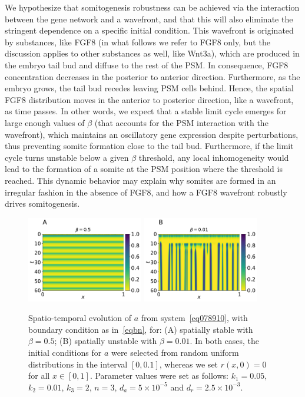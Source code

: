 \documentclass[11pt]{article}
\begin{document}
	We hypothesize that somitogenesis robustness can be achieved via the interaction
	between the gene network and a wavefront, and that this will also eliminate 
	the stringent dependence on a specific initial condition. This wavefront is originated by 
	substances, like FGF8 (in what follows we refer to FGF8 only, but the
	discussion applies to other substances as well, like Wnt3a), which are produced in the
	embryo tail bud and diffuse to the rest of the PSM. In consequence, FGF8
	concentration decreases in the posterior to anterior direction. Furthermore, 
	as the embryo grows, the tail bud recedes leaving PSM cells behind. Hence,
	the spatial FGF8 distribution moves in the anterior to posterior direction, like
	a wavefront, as time passes. In other words, we expect that a stable limit cycle 
	emerges for large
	enough values of $\beta$ (that accounts for the PSM interaction with the
	wavefront), which maintains an oscillatory gene expression despite perturbations, 
	thus preventing somite formation close to the tail bud. Furthermore, if the limit
	cycle turns unstable below a given $\beta$ threshold, any local inhomogeneity would
	lead to the formation of a somite at the PSM position where the threshold is
	reached. This dynamic behavior may explain why somites are formed in an
	irregular fashion in the absence of FGF8, and how a FGF8 wavefront robustly
	drives somitogenesis.
	
	\begin{figure}[t!]
		\centering
		\includegraphics[width=2in]{Figures/Fig03aRev.pdf}
		\includegraphics[width=2in]{Figures/Fig03bRev.pdf}
		\caption{Spatio-temporal evolution of $a$ from system~\eqref{eq078910}, with
			boundary condition as in~\eqref{eqbn}, for: (A) spatially stable with
			$\beta=0.5$; (B) spatially unstable with $\beta=0.01$. In both cases, the
			initial conditions for $a$ were selected from random uniform distributions in
			the interval $[0, 0.1]$, whereas we set $r(x, 0) = 0$ for all $x\in[0,1]$.
			Parameter values were set as follows: $k_1=0.05$, $k_2=0.01$, $k_3=2$, $n=3$, $d_a =
			5\times10^{-5}$ and $d_r=2.5\times10^{-3}$.}
		\label{Fig03}
	\end{figure}
	
\end{document}
